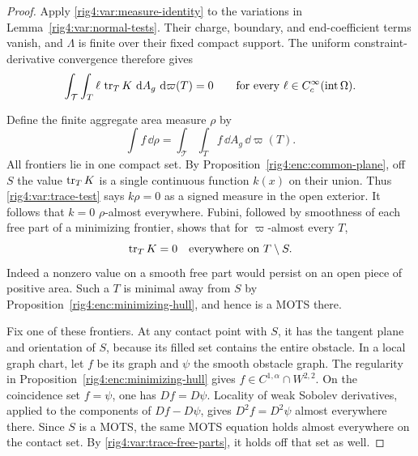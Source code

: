\begin{proof}
Apply \eqref{rig4:var:measure-identity} to the variations in
Lemma~\ref{rig4:var:normal-tests}. Their charge, boundary, and end-coefficient
terms vanish, and $\Lambda$ is finite over their fixed compact support.
The uniform constraint-derivative convergence therefore gives
\begin{equation}
 \int_{\mathcal T}\int_T\ell\,\operatorname{tr}_T K\,\,\mathrm d A_g\,\,\mathrm d\varpi(T)=0
 \qquad\text{for every }\ell\in C^\infty_c(\operatorname{int}\Omega).
\label{rig4:var:trace-test}
\end{equation}

Define the finite aggregate area measure $\rho$ by
\[
 \int f\,\dd\rho
   =\int_{\mathcal T}\int_T f\,\dd A_g\,\dd\varpi(T).
\]
All frontiers lie in one compact set. By
Proposition~\ref{rig4:enc:common-plane}, off $S$ the value $\operatorname{tr}_TK$ is a single
continuous function $k(x)$ on their union. Thus
\eqref{rig4:var:trace-test} says $k\rho=0$ as a signed measure in the open
exterior. It follows that $k=0$ $\rho$-almost everywhere. Fubini, followed
by smoothness of each free part of a minimizing frontier, shows that for
$\varpi$-almost every $T$,
\begin{equation}
 \operatorname{tr}_TK=0\quad\hbox{everywhere on }T\setminus S.
\label{rig4:var:trace-free-parts}
\end{equation}
Indeed a nonzero value on a smooth free part would persist on an open
piece of positive area. Such a $T$ is minimal away from $S$ by
Proposition~\ref{rig4:enc:minimizing-hull}, and hence is a MOTS there.

Fix one of these frontiers. At any contact point with $S$, it has the
tangent plane and orientation of $S$, because its filled set contains the
entire obstacle. In a local graph chart, let $f$ be its graph and $\psi$
the smooth obstacle graph. The regularity in
Proposition~\ref{rig4:enc:minimizing-hull} gives $f\in C^{1,\alpha}\cap W^{2,2}$.
On the coincidence set $f=\psi$, one has $Df=D\psi$. Locality of weak
Sobolev derivatives, applied to the components of $Df-D\psi$, gives
$D^2f=D^2\psi$ almost everywhere there. Since $S$ is a MOTS, the same
MOTS equation holds almost everywhere on the contact set. By
\eqref{rig4:var:trace-free-parts}, it holds off that set as well.


\end{proof}
